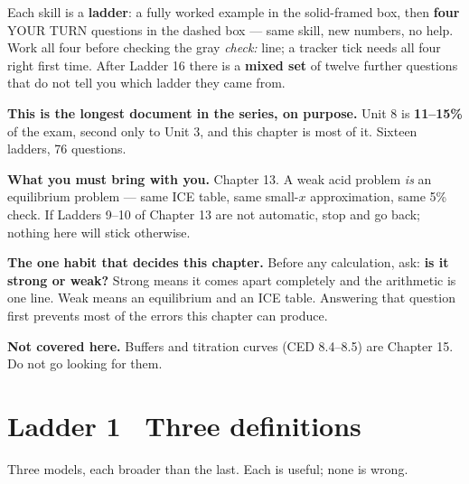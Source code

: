 \documentclass{apchem-worksheet}
\begin{document}
\apctitleblock

\begin{apcnote}
Each skill is a \textbf{ladder}: a fully worked example in the
solid-framed box, then \textbf{four} YOUR TURN questions in the dashed
box --- same skill, new numbers, no help. Work all four before checking
the gray \emph{check:} line; a tracker tick needs all four right first
time. After Ladder 16 there is a \textbf{mixed set} of twelve further
questions that do not tell you which ladder they came from.

\textbf{This is the longest document in the series, on purpose.} Unit 8
is \textbf{11--15\%} of the exam, second only to Unit 3, and this
chapter is most of it. Sixteen ladders, 76 questions.

\textbf{What you must bring with you.} Chapter 13. A weak acid problem
\emph{is} an equilibrium problem --- same ICE table, same small-$x$
approximation, same 5\% check. If Ladders 9--10 of Chapter 13 are not
automatic, stop and go back; nothing here will stick otherwise.

\textbf{The one habit that decides this chapter.} Before any
calculation, ask: \textbf{is it strong or weak?} Strong means it comes
apart completely and the arithmetic is one line. Weak means an
equilibrium and an ICE table. Answering that question first prevents
most of the errors this chapter can produce.

\textbf{Not covered here.} Buffers and titration curves (CED 8.4--8.5)
are Chapter 15. Do not go looking for them.
\end{apcnote}

\section*{\sffamily Ladder 1 \textbullet\ Three definitions}

Three models, each broader than the last. Each is useful; none is wrong.
\end{document}
